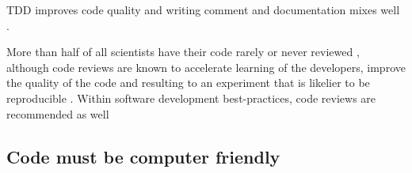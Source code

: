 TDD improves code quality \cite{alkaoud2018quality,janzen2006test}
and writing comment and documentation mixes well \cite{shmerlin2015document}.


More than half of all scientists have their code 
rarely or never reviewed \cite{vable2021code},
although code reviews are known to
accelerate learning of the developers,
improve the quality of the code
and resulting to an experiment that is likelier to be reproducible
\cite{vable2021code}.
Within software development best-practices, 
code reviews are recommended as well \cite{wilson2014best} 


\subsection{Code must be computer friendly}

